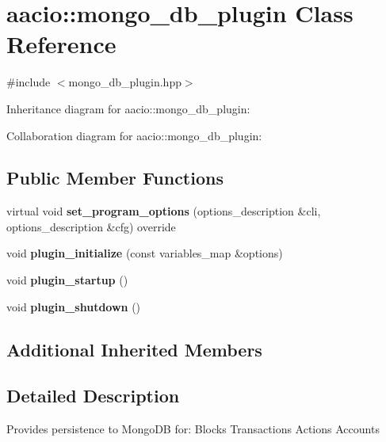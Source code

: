 \hypertarget{classaacio_1_1mongo__db__plugin}{}\section{aacio\+:\+:mongo\+\_\+db\+\_\+plugin Class Reference}
\label{classaacio_1_1mongo__db__plugin}


{\ttfamily \#include $<$mongo\+\_\+db\+\_\+plugin.\+hpp$>$}



Inheritance diagram for aacio\+:\+:mongo\+\_\+db\+\_\+plugin\+:


Collaboration diagram for aacio\+:\+:mongo\+\_\+db\+\_\+plugin\+:
\subsection*{Public Member Functions}
\begin{DoxyCompactItemize}
\item 
\mbox{\label{classaacio_1_1mongo__db__plugin_a86f9257b63da541cab0a1a2315b723c7}} 
virtual void {\bfseries set\+\_\+program\+\_\+options} (options\+\_\+description \&cli, options\+\_\+description \&cfg) override
\item 
\mbox{\label{classaacio_1_1mongo__db__plugin_a497af45a326e2ad872bd263731accf05}} 
void {\bfseries plugin\+\_\+initialize} (const variables\+\_\+map \&options)
\item 
\mbox{\label{classaacio_1_1mongo__db__plugin_afb4e2a4413831b3cbf5d4a93e5937c63}} 
void {\bfseries plugin\+\_\+startup} ()
\item 
\mbox{\label{classaacio_1_1mongo__db__plugin_acb72f24f30c6f81b2b1cc24455a37be7}} 
void {\bfseries plugin\+\_\+shutdown} ()
\end{DoxyCompactItemize}
\subsection*{Additional Inherited Members}


\subsection{Detailed Description}
Provides persistence to Mongo\+DB for\+: Blocks Transactions Actions Accounts

